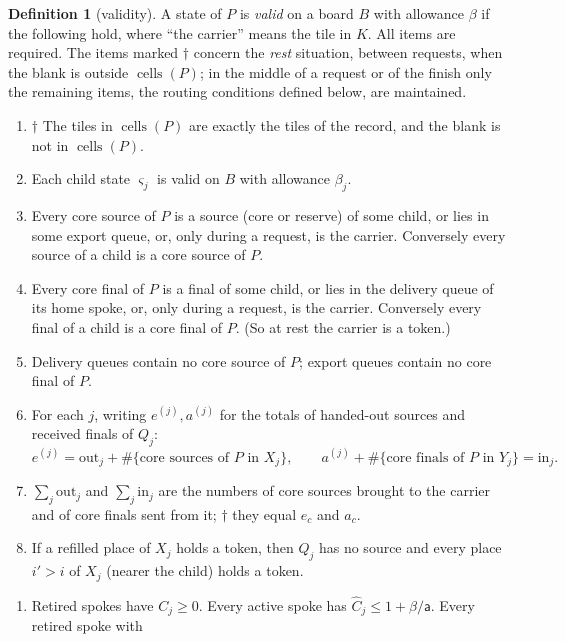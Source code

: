 \documentclass[11pt]{amsart}
\theoremstyle{definition}
\newtheorem{definition}[theorem]{Definition}
\newcommand{\cells}{\operatorname{cells}}
\begin{document}
\begin{definition}[validity]\label{def:inv}
A state of $P$ is \emph{valid} on a board $B$ with allowance $\beta$ if the following hold, where ``the carrier'' means
the tile in $K$. All items are required. The items marked $\dagger$ concern the \emph{rest} situation, between requests,
when the blank is outside $\cells(P)$; in the middle of a request or of the finish only the remaining items, the routing
conditions defined below, are maintained.
\begin{enumerate}[label=(I\arabic*),nosep,start=0]
\item\label{I:rest} $\dagger$ The tiles in $\cells(P)$ are exactly the tiles of the record, and the blank is not in $\cells(P)$.
\item\label{I:child} Each child state $\varsigma_j$ is valid on $B$ with allowance $\beta_j$.
\item\label{I:src} Every core source of $P$ is a source (core or reserve) of some child, or lies in some export queue, or,
  only during a request, is the carrier. Conversely every source of a child is a core source of $P$.
\item\label{I:fin} Every core final of $P$ is a final of some child, or lies in the delivery queue of its home spoke, or,
  only during a request, is the carrier. Conversely every final of a child is a core final of $P$.
  (So at rest the carrier is a token.)
\item\label{I:queues} Delivery queues contain no core source of $P$; export queues contain no core final of $P$.
\item\label{I:bridge} For each $j$, writing $e^{(j)},a^{(j)}$ for the totals of handed-out sources and
  received finals of $Q_j$:
  \[
  e^{(j)}=\mathrm{out}_j+\#\{\text{core sources of $P$ in }X_j\},\qquad
  a^{(j)}+\#\{\text{core finals of $P$ in }Y_j\}=\mathrm{in}_j .
  \]
\item\label{I:sum} $\sum_j\mathrm{out}_j$ and $\sum_j\mathrm{in}_j$ are the numbers of core sources brought to the carrier and of core
  finals sent from it; $\dagger$ they equal $e_c$ and $a_c$.
\item\label{I:delim} If a refilled place of $X_j$ holds a token, then $Q_j$ has no source and every place $i'>i$ of $X_j$ (nearer the child) holds a token.
\end{enumerate}
\begin{enumerate}[label=(L\arabic*),nosep]
\item\label{L:peak} Retired spokes have $C_j\ge0$. Every active spoke has $\hat C_j\le1+\beta/\mathsf a$. Every retired spoke with

\end{enumerate}
\end{definition}
\end{document}
